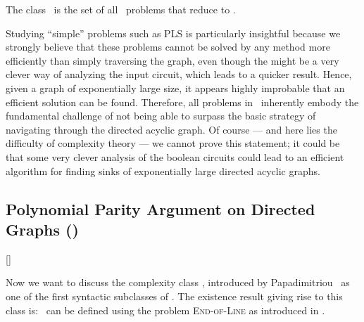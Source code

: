 \begin{definition}
	The class \PLS\ is the set of all \TFNP\ problems that reduce to \Localopt.
\end{definition}

Studying ``simple'' problems such as PLS is particularly insightful because we strongly believe that these problems cannot be solved by any method more efficiently than simply traversing the graph, even though the might be a very clever way of analyzing the input circuit, which leads to a quicker result. Hence, given a graph of exponentially large size, it appears highly improbable that an efficient solution can be found. Therefore, all problems in \PLS\ inherently embody the fundamental challenge of not being able to surpass the basic strategy of navigating through the directed acyclic graph. Of course --- and here lies the difficulty of complexity theory --- we cannot prove this statement; it could be that some very clever analysis of the boolean circuits could lead to an efficient algorithm for finding sinks of exponentially large directed acyclic graphs.

\subsection{Polynomial Parity Argument on Directed Graphs (\PPAD)}[\PPAD]

Now we want to discuss the complexity class \PPAD, introduced by Papadimitriou~ as one of the first syntactic subclasses of \TFNP. The existence result giving rise to this class is: 
\PPAD\ can be defined using the problem \textsc{End-of-Line} as introduced in .


